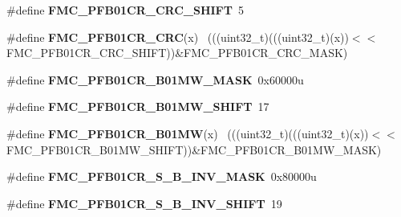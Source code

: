 \begin{DoxyCompactItemize}
\item 
\hypertarget{group___f_m_c___register___masks_gacef4ee2ef860c219ebd437e67a5522b4}{}\#define {\bfseries F\+M\+C\+\_\+\+P\+F\+B01\+C\+R\+\_\+\+C\+R\+C\+\_\+\+S\+H\+I\+F\+T}~5\label{group___f_m_c___register___masks_gacef4ee2ef860c219ebd437e67a5522b4}

\item 
\hypertarget{group___f_m_c___register___masks_ga0f77cf7694d4ee06ddca8c39c57ddda9}{}\#define {\bfseries F\+M\+C\+\_\+\+P\+F\+B01\+C\+R\+\_\+\+C\+R\+C}(x)                                          ~(((uint32\+\_\+t)(((uint32\+\_\+t)(x))$<$$<$F\+M\+C\+\_\+\+P\+F\+B01\+C\+R\+\_\+\+C\+R\+C\+\_\+\+S\+H\+I\+F\+T))\&F\+M\+C\+\_\+\+P\+F\+B01\+C\+R\+\_\+\+C\+R\+C\+\_\+\+M\+A\+S\+K)\label{group___f_m_c___register___masks_ga0f77cf7694d4ee06ddca8c39c57ddda9}

\item 
\hypertarget{group___f_m_c___register___masks_gae62e6040705f92d440468fc5335aedb4}{}\#define {\bfseries F\+M\+C\+\_\+\+P\+F\+B01\+C\+R\+\_\+\+B01\+M\+W\+\_\+\+M\+A\+S\+K}~0x60000u\label{group___f_m_c___register___masks_gae62e6040705f92d440468fc5335aedb4}

\item 
\hypertarget{group___f_m_c___register___masks_ga4cab70c6180b6d6481432e3fd6baf56d}{}\#define {\bfseries F\+M\+C\+\_\+\+P\+F\+B01\+C\+R\+\_\+\+B01\+M\+W\+\_\+\+S\+H\+I\+F\+T}~17\label{group___f_m_c___register___masks_ga4cab70c6180b6d6481432e3fd6baf56d}

\item 
\hypertarget{group___f_m_c___register___masks_ga76da456c7525c4f8dbd62e28c5f5f2f3}{}\#define {\bfseries F\+M\+C\+\_\+\+P\+F\+B01\+C\+R\+\_\+\+B01\+M\+W}(x)                                      ~(((uint32\+\_\+t)(((uint32\+\_\+t)(x))$<$$<$F\+M\+C\+\_\+\+P\+F\+B01\+C\+R\+\_\+\+B01\+M\+W\+\_\+\+S\+H\+I\+F\+T))\&F\+M\+C\+\_\+\+P\+F\+B01\+C\+R\+\_\+\+B01\+M\+W\+\_\+\+M\+A\+S\+K)\label{group___f_m_c___register___masks_ga76da456c7525c4f8dbd62e28c5f5f2f3}

\item 
\hypertarget{group___f_m_c___register___masks_gae3bc21ea1424abfb619617095b7850c8}{}\#define {\bfseries F\+M\+C\+\_\+\+P\+F\+B01\+C\+R\+\_\+\+S\+\_\+\+B\+\_\+\+I\+N\+V\+\_\+\+M\+A\+S\+K}~0x80000u\label{group___f_m_c___register___masks_gae3bc21ea1424abfb619617095b7850c8}

\item 
\hypertarget{group___f_m_c___register___masks_ga0eac04ae9cdca4c61121f913ad54445d}{}\#define {\bfseries F\+M\+C\+\_\+\+P\+F\+B01\+C\+R\+\_\+\+S\+\_\+\+B\+\_\+\+I\+N\+V\+\_\+\+S\+H\+I\+F\+T}~19\label{group___f_m_c___register___masks_ga0eac04ae9cdca4c61121f913ad54445d}


\end{DoxyCompactItemize}
